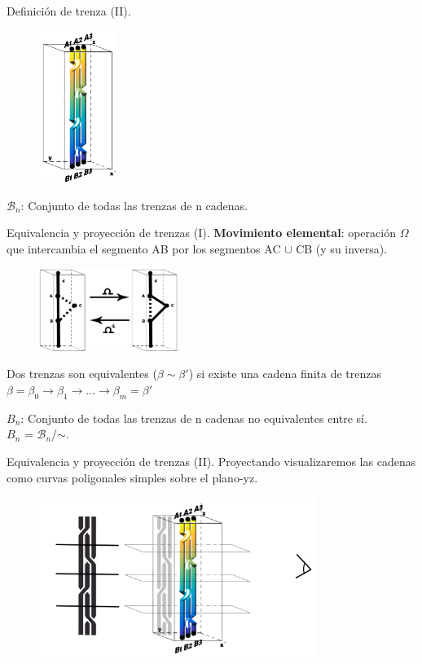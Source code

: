 \documentclass{beamer}
\begin{document}
\begin{frame}{Definición de trenza (II).}
\begin{figure}[h!]
	\includegraphics[width=2.5cm]{imagenes/t2cubo.png}
\end{figure}
\begin{alertblock}{$\mathscr{B}_{n}$:}
	Conjunto de todas las trenzas de n cadenas.
\end{alertblock}
\end{frame}

\begin{frame}{Equivalencia y proyección de trenzas (I). }
	\textbf{Movimiento elemental}: operación $ \Omega $ que intercambia el segmento AB por los segmentos AC $ \cup $ CB (y su inversa).
	\begin{figure}[h!]
		\includegraphics[width=4.5cm]{imagenes/elemental.png}
	\end{figure}

	Dos trenzas son equivalentes ($\beta \sim \beta'$) si existe una cadena finita de trenzas
		$ \beta = \beta_{0} \rightarrow \beta_{1} \rightarrow ... \rightarrow \beta_{m}=\beta'$
	
	\begin{alertblock}{${B}_{n}$:}
		Conjunto de todas las trenzas de n cadenas no equivalentes entre sí. \\
		${B}_{n}$ = $\mathscr{B}_{n}$/$ \sim $.\\
    \end{alertblock}
\end{frame}

\begin{frame}{Equivalencia y proyección de trenzas (II). }
	Proyectando visualizaremos las cadenas como curvas poligonales
	simples sobre el plano-yz.
	\begin{figure}[h!]
		\includegraphics[width=9cm]{imagenes/pers.png}
	\end{figure}
\end{frame}
\end{document}
